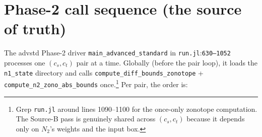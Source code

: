 \documentclass[11pt]{article}
\newcommand{\src}[1]{\texttt{\small #1}}
\newcommand{\fileline}[2]{\src{#1}:\src{#2}}
\begin{document}
\section{Phase-2 call sequence (the source of truth)}
\label{sec:driver}

The advstd Phase-2 driver \src{main\_advanced\_standard} in
\fileline{run.jl}{630--1052} processes one $(c_s, c_t)$ pair at a time.
Globally (before the pair loop), it loads the \texttt{n1\_state}
directory and calls \src{compute\_diff\_bounds\_zonotope} +
\src{compute\_n2\_zono\_abs\_bounds} once.\footnote{Grep
\src{run.jl} around lines 1090--1100 for the once-only zonotope
computation. The Source-B pass is genuinely shared across $(c_s, c_t)$
because it depends only on $N_2$'s weights and the input box.}
Per pair, the order is:
\end{document}
